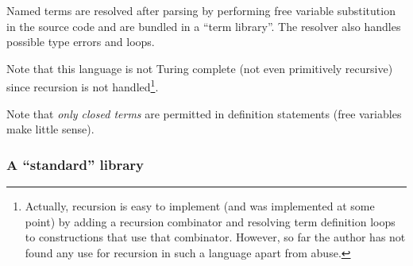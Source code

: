 \documentclass[main.tex]{subfiles}
\begin{document}
Named terms are resolved after parsing by performing free variable substitution
in the source code and are bundled in a ``term library''. The resolver also
handles possible type errors and loops.

Note that this language is not Turing complete (not even primitively recursive)
since recursion is not handled\footnote{
    Actually, recursion is easy to implement (and was implemented at some point)
    by adding a recursion combinator
    and resolving term definition loops to constructions that use that combinator.
    However, so far the author has not found any use for recursion in such a language
    apart from abuse.
}.

Note that \emph{only closed terms} are permitted in definition statements
(free variables make little sense).

\subsubsection{A ``standard'' library}
\label{stdlib}
\end{document}
